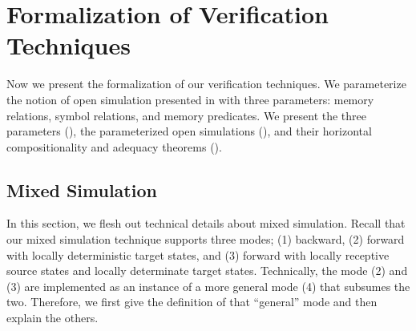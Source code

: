\section{Formalization of Verification Techniques}
\label{sec:compiler:verification}

Now we present the formalization of our verification techniques.
We parameterize the notion of open simulation presented in
 with three parameters: memory relations, symbol
relations, and memory predicates.  We present the three parameters
(), the parameterized open simulations
(), and their horizontal compositionality and adequacy theorems
().

\subsection{Mixed Simulation}
In this section, we flesh out technical details about mixed simulation.
Recall that our mixed simulation technique supports three modes; (1) backward, (2) forward with locally deterministic target states, and (3) forward with locally receptive source states and locally determinate target states.
Technically, the mode (2) and (3) are implemented as an instance of a more general mode (4) that subsumes the two.
Therefore, we first give the definition of that ``general'' mode and then explain the others.

